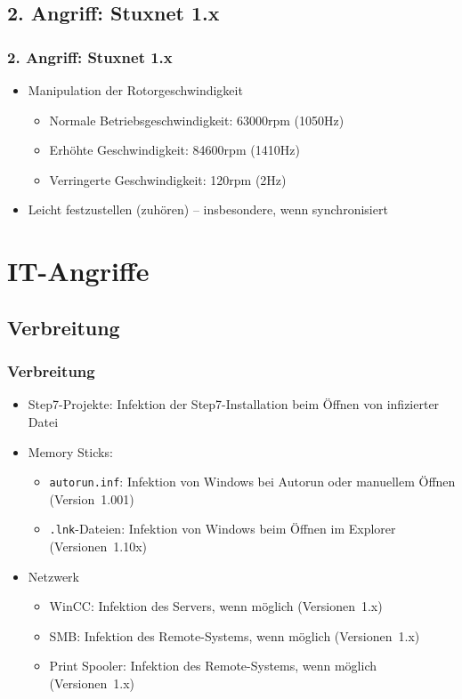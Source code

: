 \documentclass{beamer}
\begin{document}
\subsection{2. Angriff: Stuxnet 1.x}

\begin{frame}
  \frametitle{2. Angriff: Stuxnet 1.x}
  \begin{itemize}
    \item Manipulation der Rotorgeschwindigkeit
      \begin{itemize}
        \item Normale Betriebsgeschwindigkeit: 63000rpm (1050Hz)
        \item Erhöhte Geschwindigkeit: 84600rpm (1410Hz)
        \item Verringerte Geschwindigkeit: 120rpm (2Hz)
      \end{itemize}
    \item Leicht festzustellen (zuhören) – insbesondere, wenn synchronisiert
  \end{itemize}
\end{frame}

\section{IT-Angriffe}

\subsection{Verbreitung}

\begin{frame}
  \frametitle{Verbreitung}
  \begin{itemize}
    \item Step7-Projekte: Infektion der Step7-Installation beim Öffnen von infizierter Datei
    \item Memory Sticks:
      \begin{itemize}
        \item \texttt{autorun.inf}: Infektion von Windows bei Autorun oder manuellem Öffnen (Version~1.001)
        \item \texttt{.lnk}-Dateien: Infektion von Windows beim Öffnen im Explorer (Versionen~1.10x)
      \end{itemize}
    \item Netzwerk
      \begin{itemize}
        \item WinCC: Infektion des Servers, wenn möglich (Versionen~1.x)
        \item SMB: Infektion des Remote-Systems, wenn möglich (Versionen~1.x)
        \item Print Spooler: Infektion des Remote-Systems, wenn möglich (Versionen~1.x)
      \end{itemize}
  \end{itemize}
\end{frame}
\end{document}
